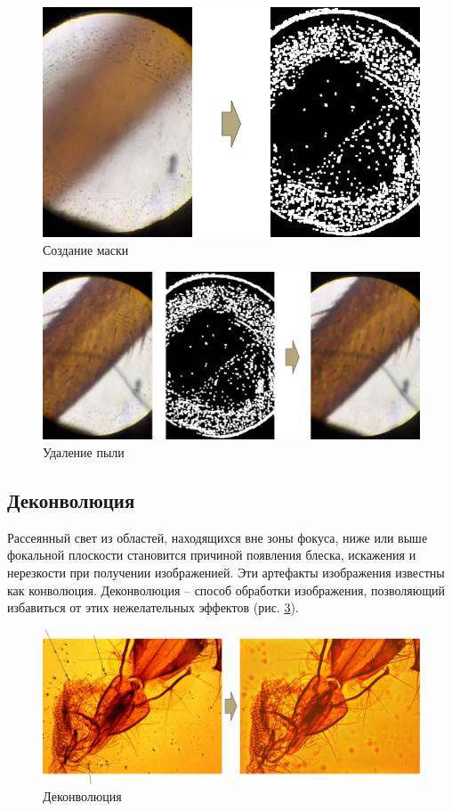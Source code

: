 \documentclass[14pt]{matmex-diploma-custom}
\begin{document}
\begin{figure}[h]
\centering
\includegraphics[width=1.0\textwidth]{figures/dust1.png}
\caption{Создание маски}
\label{dust_map1}
\end{figure}

\newpage

\begin{figure}[h]
\centering
\includegraphics[width=1.0\textwidth]{figures/dust2.png}
\caption{Удаление пыли}
\label{dust_filtering1}
\end{figure}


\subsection{Деконволюция}
Рассеянный свет из областей, находящихся вне зоны фокуса, ниже или выше фокальной плоскости становится причиной появления блеска, искажения и нерезкости при получении изображенией. Эти артефакты изображения известны как конволюция. Деконволюция – способ обработки изображения, позволяющий избавиться от этих нежелательных эффектов (рис. \ref{deconvolution1}).

\begin{figure}[h]
\centering
\includegraphics[width=1.0\textwidth]{figures/deconvolution1.png}
\caption{Деконволюция}
\label{deconvolution1}
\end{figure}
\end{document}
